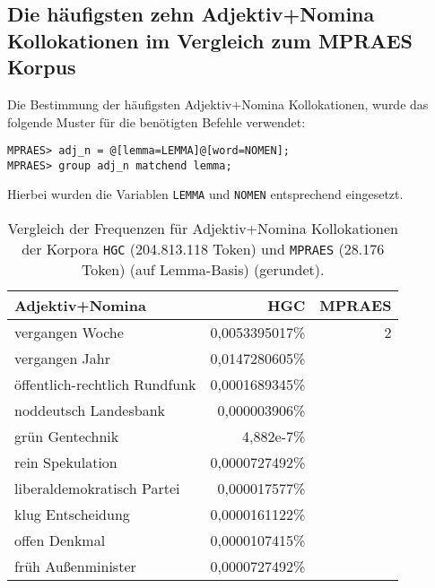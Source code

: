 \documentclass[%
	type=document,%
  	style=article,%
  	media=print,
  	pages=oneside,%
  	prefixLecturer=Dozenten:,
  	author=multiple,
]{unihildesheim} %
\begin{document}
\subsection{Die häufigsten zehn Adjektiv+Nomina Kollokationen im Vergleich zum
MPRAES Korpus}
Die Bestimmung der häufigsten Adjektiv+Nomina Kollokationen, wurde das folgende
Muster für die benötigten Befehle verwendet:
\begin{Verbatim}[frame=single,label=CQP,commandchars=\\\{\}]
MPRAES> adj_n = @[lemma=LEMMA]@[word=NOMEN];
MPRAES> group adj_n matchend lemma;
\end{Verbatim}
Hierbei wurden die Variablen \texttt{LEMMA} und \texttt{NOMEN} entsprechend
 eingesetzt.
\begin{table}[htpb]\label{t}
	\center
	\begin{tabularx}{0.6\textwidth}{lrr}
		\toprule
		\textbf{Adjektiv+Nomina} & \textbf{HGC} & \textbf{MPRAES}\\
		\midrule
		vergangen Woche & 0,0053395017\% & 2\\
		vergangen Jahr & 0,0147280605\% &\\
		öffentlich-rechtlich Rundfunk & 0,0001689345\% &\\
		noddeutsch Landesbank & 0,000003906\% &\\
		grün Gentechnik & 4,882e-7\% &\\
		rein Spekulation & 0,0000727492\% &\\
		liberaldemokratisch Partei & 0,000017577\% &\\
		klug Entscheidung & 0,0000161122\% &\\
		offen Denkmal & 0,0000107415\% &\\
		früh Außenminister & 0,0000727492\% &\\
		\bottomrule
	\end{tabularx}
	\caption{Vergleich der Frequenzen für Adjektiv+Nomina Kollokationen der
	Korpora \texttt{HGC} (204.813.118 Token) und \texttt{MPRAES} (28.176 Token)
	(auf Lemma-Basis) (gerundet).}
	\label{tab:compare_adj_n}
\end{table}
\end{document}

